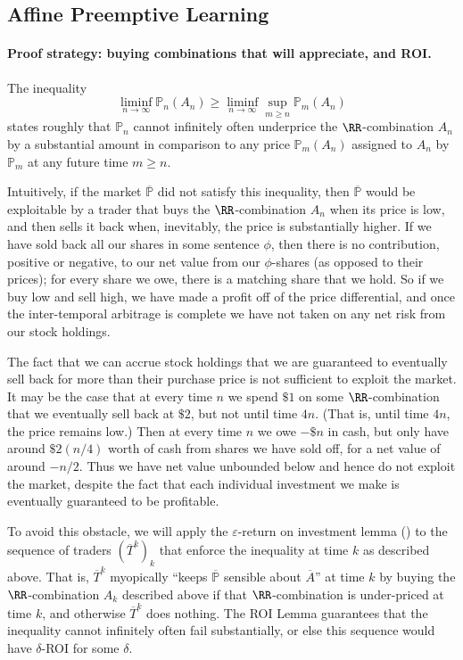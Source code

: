 \documentclass[authordate,onecolumn,noenvironments]{miri-tech-article}
\numberwithin{equation}{subsection}
\newcommand{\seq}[1]{{\overline{#1}}}
\newcommand{\nn}{n}
\newcommand{\aff}{A}
\newcommand{\trade}{T}%
\newcommand{\Trader}{\seq{\trade}} %
\newcommand{\BelState}{\mathbb{P}}
\newcommand{\pt}{\BelState}
\newcommand{\MP}{\seq{\pt}}
\begin{document}
\subsection{Affine Preemptive Learning}\label{app:affpolymax}

\affpolymax*


\paragraph{Proof strategy:  buying combinations that will appreciate, and ROI.}


The inequality
%
\[ \liminf_{\nn\to\infty}\pt_{\nn}(\aff_{\nn}) \ge \liminf_{\nn\rightarrow\infty}\sup_{m \ge n}\pt_{m}(\aff_{n}) \]
%
 states roughly that $\pt_n$ cannot infinitely often underprice   the $\RR$-combination
   $\aff_{n}$ by a substantial amount in comparison to any price $\pt_{m}(\aff_{n})$ assigned to $\aff_{n}$ by $\pt_m$ at any future time $m\ge
   n$.

Intuitively, if the market $\MP$ did not satisfy this inequality, then $\MP$ would be exploitable by a trader that buys the $\RR$-combination $\aff_{n}$
when 
  its price is low, and then sells it back when, inevitably, the price is substantially higher. 
  If we have sold back all our shares in some sentence $\phi$, then there is no
  contribution, positive or negative, to our
  net value from our $\phi$-shares (as opposed to their prices); for every share we owe, there is a matching share that we hold.
  So if we buy low and sell high, we have made a profit off of the price
  differential, and once the inter-temporal arbitrage is complete we have not taken on any net risk from our stock holdings.  

The fact that we can accrue stock 
holdings that we are guaranteed to eventually sell back for more than their purchase price is not sufficient to exploit the market. It
may be the case that at every time $n$ we spend $\$ 1$ on some $\RR$-combination that we eventually sell back at $\$ 2$, but not 
 until time
$4n$. (That is, until time $4n$, the price remains low.) 
Then at every time $n$ we owe $-\$ n$ in cash, but only have around $\$ 2(n/4)$ worth of cash from shares we have sold off,
for a net value of around $-n/2$. Thus we have net value unbounded below and hence do not exploit the market,
despite the fact that each individual investment we make is eventually guaranteed to be  profitable.

To avoid this obstacle, we will apply 
  the  $\varepsilon$-return on investment lemma () to the sequence of traders $(\Trader^k)_k$ that enforce the inequality at time
 $k$ as  described above. That is, $\Trader^k$ myopically ``keeps $\MP$ sensible about
$\seq{\aff}$'' at time $k$ by buying the $\RR$-combination $\aff_k$
described above if that $\RR$-combination is under-priced at time $k$, and otherwise $\Trader^k$ does nothing.
The ROI Lemma guarantees that the inequality cannot infinitely often fail substantially, or else this sequence would have $\delta$-ROI for some $\delta$. 
\end{document}

